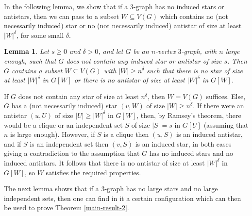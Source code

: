 \documentclass[11pt]{article}
\let\oldendproof\endproof
\renewenvironment{proof}[1][\proofname]{%
	\oldproof[\bf #1]%
}{\oldendproof}
\theoremstyle{plain}
\newtheorem{lemma}[theorem]{Lemma}
\begin{document}

In the following lemma, we show that if a $3$-graph has no induced stars or antistars, then we can pass to a subset $W \subseteq V(G)$ which contains no (not necessarily induced) star or no (not necessarily induced) antistar of size at least $|W|^{\delta}$, for some small $\delta$. 

\begin{lemma} \label{no-large-star}
    Let $s \geq 0$ and $\delta > 0$, and let $G$ be an $n$-vertex $3$-graph, with $n$ large enough, such that $G$ does not contain any induced star or antistar of size $s$. Then $G$ contains a subset $W \subseteq V(G)$ with $|W| \geq n^\delta$ such that there is no star of size at least $|W|^\delta$ in $G[W]$ or there is no antistar of size at least $|W|^\delta$ in $G[W]$.
\end{lemma}
\begin{proof}
    If $G$ does not contain any star of size at least $n^\delta$, then $W=V(G)$ suffices. Else, $G$ has a (not necessarily induced) star $(v,W)$ of size $|W| \geq n^\delta$. If there were an antistar $(u,U)$ of size $|U| \geq |W|^\delta$ in $G[W]$, then, by Ramsey's theorem, there would be a clique or an independent set $S$ of size $|S| = s$ in $G[U]$ (assuming that $n$ is large enough). However, if $S$ is a clique then $(u,S)$ is an induced antistar, and if $S$ is an independent set then $(v,S)$ is an induced star, in both cases giving a contradiction to the assumption that $G$ has no induced stars and no induced antistars. It follows that there is no antistar of size at least $|W|^\delta$ in $G[W]$, so $W$ satisfies the required properties.
\end{proof}

The next lemma shows that if a $3$-graph has no large stars and no large independent sets, then one can find in it a certain configuration which can then be used to prove Theorem \ref{main-result-2}.
\end{document}
